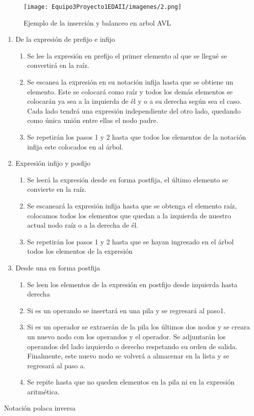 \documentclass{report}
\begin{document}
\begin{figure}[h]
        \centering
        \texttt{[image: Equipo3Proyecto1EDAII/imagenes/2.png]}
        \caption{Ejemplo de la inserción y balanceo en arbol AVL}
        \label{fig:my_label}
\end{figure}
\begin{enumerate}
    \item De la expresión de prefijo e infijo
    \begin{enumerate}
        \item Se lee la expresión en prefijo el primer elemento al que se llegué se convertirá en la raíz.
        \item Se escanea la expresión en su notación infija hasta que se obtiene un elemento. Este se colocará como raíz y todos los demás elementos se colocarán ya sea a la izquierda de él y o a su derecha según sea el caso. Cada lado tendrá una expresión independiente del otro lado, quedando como única unión entre ellas el nodo padre.
        \item Se repetirán los pasos 1 y 2 hasta que todos los elementos de la notación infija este colocados en al árbol.

    \end{enumerate}
    \item Expresión infijo y posfijo
    \begin{enumerate}
        \item Se leerá la expresión desde su forma postfija, el último elemento se convierte en la raíz.
        \item Se escaneará la expresión infija hasta que se obtenga el elemento raíz, colocamos todos los elementos que quedan a la izquierda de nuestro actual nodo raíz o a la derecha de él.
        \item Se repetirán los pasos 1 y 2 hasta que se hayan ingresado en el árbol todos los elementos de la expresión
    \end{enumerate}
    \item Desde una en forma postfija\begin{enumerate}
        \item Se leen los elementos de la expresión en postfijo desde izquierda hasta derecha
        \item Si es un operando se insertará en una pila y se regresará al paso1.
        \item Si es un operador se extraerán de la pila los últimos dos nodos y se creara un nuevo nodo con los operandos y el operador. Se adjuntarán los operandos del lado izquierdo o derecho respetando su orden de salida. Finalmente, este nuevo nodo se volverá a almacenar en la lista y se regresará al paso a.
        \item Se repite hasta que no queden elementos en la pila ni en la expresión aritmética.
    \end{enumerate}
\end{enumerate}
 Notación polaca inversa\\\
\end{document}
